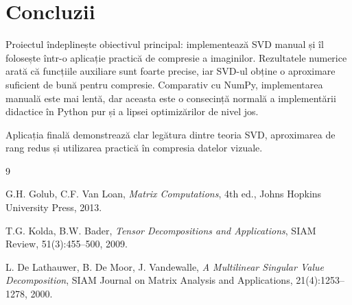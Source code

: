 \documentclass[12pt,a4paper]{article}
\theoremstyle{definition}
\begin{document}
\section{Concluzii}

Proiectul îndeplinește obiectivul principal: implementează SVD manual și îl folosește într-o aplicație practică de compresie a imaginilor. Rezultatele numerice arată că funcțiile auxiliare sunt foarte precise, iar SVD-ul obține o aproximare suficient de bună pentru compresie. Comparativ cu NumPy, implementarea manuală este mai lentă, dar aceasta este o consecință normală a implementării didactice în Python pur și a lipsei optimizărilor de nivel jos.

Aplicația finală demonstrează clar legătura dintre teoria SVD, aproximarea de rang redus și utilizarea practică în compresia datelor vizuale.

\begin{thebibliography}{9}

G.H. Golub, C.F. Van Loan,
\textit{Matrix Computations}, 4th ed.,
Johns Hopkins University Press, 2013.

T.G. Kolda, B.W. Bader,
\textit{Tensor Decompositions and Applications},
SIAM Review, 51(3):455--500, 2009.

L. De Lathauwer, B. De Moor, J. Vandewalle,
\textit{A Multilinear Singular Value Decomposition},
SIAM Journal on Matrix Analysis and Applications, 21(4):1253--1278, 2000.

\end{thebibliography}
\end{document}
